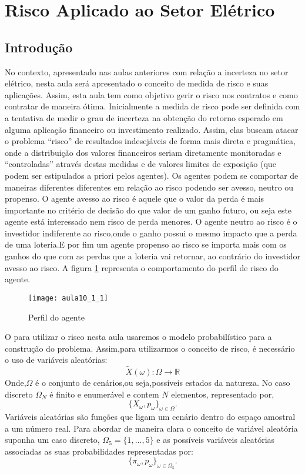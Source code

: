 \section{Risco Aplicado ao Setor Elétrico}

\subsection{Introdução}
  No contexto, apresentado nas aulas anteriores com relação a incerteza no setor elétrico, nesta aula será apresentado o conceito de medida de risco e suas aplicações. Assim, esta aula tem como objetivo gerir o risco nos contratos e como contratar de maneira ótima.
  Inicialmente a medida de risco pode ser definida com a tentativa de medir o grau de incerteza na obtenção do retorno esperado em alguma aplicação financeiro ou investimento realizado. Assim, elas buscam atacar o problema “risco” de resultados indesejáveis de forma mais direta e pragmática, onde a distribuição dos valores financeiros seriam diretamente monitoradas e “controladas” através destas medidas e de valores limites de exposição (que podem ser estipulados a priori pelos agentes). 
  Os agentes podem se comportar de maneiras diferentes diferentes em relação ao risco podendo ser avesso, neutro ou propenso. O agente avesso ao risco é aquele que o valor da perda é mais importante no critério de decisão do que valor de um ganho futuro, ou seja este agente está interessado nem risco de perda menores. O agente neutro ao risco é o investidor indiferente ao risco,onde o ganho possui o mesmo impacto que a perda de uma loteria.E por fim um agente propenso ao risco se importa mais com os ganhos do que com as perdas que a loteria vai retornar, ao contrário do investidor avesso ao risco. A figura \ref{fig:aula10_1_1} representa o comportamento do perfil de risco do agente.
 
\begin{figure}[H]
\begin{centering}
\texttt{[image: aula10\_1\_1]}\protect\caption{\label{fig:aula10_1_1} Perfil do agente}
\end{centering}
\end{figure}

O para utilizar o risco nesta aula usaremos o modelo probabilístico para a construção do problema. Assim,para utilizarmos o conceito de risco, é necessário o uso de variáveis aleatórias: \[
\tilde{X}(\omega):\Omega\rightarrow\mathbb{R}
\]
Onde,$\Omega$ é o conjunto de cenários,ou seja,possíveis estados da natureza. No caso discreto $\Omega_{N}$ é finito e enumerável  e contem $N$ elementos, representado por,
\[
\{X_{\omega},p_{\omega}\}_{\omega\in\Omega}.
\]
 Variáveis aleatórias são funções que ligam um cenário dentro do espaço amostral a um número real. Para abordar de maneira clara o conceito de variável aleatória suponha um caso discreto, $\Omega_{5}=\{1,...,5\}$ e as possíveis variáveis aleatórias associadas as suas probabilidades representadas por:
 \[
\{\pi_{\omega},p_{\omega}\}_{\omega\in\Omega_{5}}.
\]

